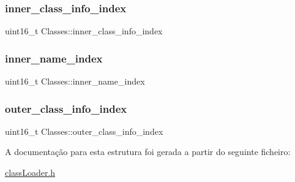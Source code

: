 \hypertarget{struct_classes_a98fa3268c87694828cf50cfd2b599262}{}\label{struct_classes_a98fa3268c87694828cf50cfd2b599262} 
\subsubsection{\texorpdfstring{inner\+\_\+class\+\_\+info\+\_\+index}{inner\_class\_info\_index}}
{\footnotesize\ttfamily uint16\+\_\+t Classes\+::inner\+\_\+class\+\_\+info\+\_\+index}

\hypertarget{struct_classes_adf9e2bd7f6af4bb97362aa98d6ddd4ad}{}\label{struct_classes_adf9e2bd7f6af4bb97362aa98d6ddd4ad} 
\subsubsection{\texorpdfstring{inner\+\_\+name\+\_\+index}{inner\_name\_index}}
{\footnotesize\ttfamily uint16\+\_\+t Classes\+::inner\+\_\+name\+\_\+index}

\hypertarget{struct_classes_a8a7bf0f9ba61c6f429411254c9825c7a}{}\label{struct_classes_a8a7bf0f9ba61c6f429411254c9825c7a} 
\subsubsection{\texorpdfstring{outer\+\_\+class\+\_\+info\+\_\+index}{outer\_class\_info\_index}}
{\footnotesize\ttfamily uint16\+\_\+t Classes\+::outer\+\_\+class\+\_\+info\+\_\+index}



A documentação para esta estrutura foi gerada a partir do seguinte ficheiro\+:\begin{DoxyCompactItemize}
\item 
\hyperlink{class_loader_8h}{class\+Loader.\+h}\end{DoxyCompactItemize}
